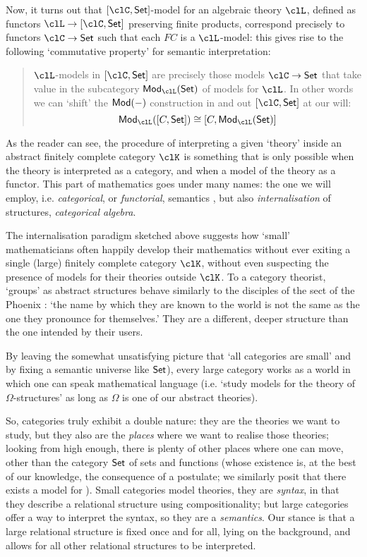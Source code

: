 Now, it turns out that $[\clC,\Set]$-model for an algebraic theory $\clL$, defined as functors $\clL \to [\clC,\Set]$ preserving finite products, correspond precisely to functors $\clC\to \Set$ such that each $FC$ is a $\clL$-model: this gives rise to the following `commutative property' for semantic interpretation:
\begin{quote}
    $\clL$-models in $[\clC,\Set]$ are precisely those models $\clC \to \Set$ that take value in the subcategory $\cate{Mod}_{\clL}(\Set)$ of models for $\clL$. In other words we can `shift' the $\mathsf{Mod}(-)$ construction in and out $[\clC,\Set]$ at our will:
    \[
        \cate{Mod}_{\clL}([C,\Set]) \cong [C, \cate{Mod}_{\clL}(\Set)]
    \]
\end{quote}
As the reader can see, the procedure of interpreting a given `theory' inside an abstract finitely complete category $\clK$ is something that is only possible when the theory is interpreted as a category, and when a model of the theory as a functor. This part of mathematics goes under many names: the one we will employ, i.e. \emph{categorical}, or \emph{functorial}, semantics \cite{lawvere1963functorial}, but also \emph{internalisation} of structures, \emph{categorical algebra}.

The internalisation paradigm sketched above suggests how `small' mathematicians often happily develop their mathematics without ever exiting a single (large) finitely complete category $\clK$, without even suspecting the presence of models for their theories outside $\clK$. To a category theorist, `groups' as abstract structures behave similarly to the disciples of the sect of the Phoenix \cite{fenix}: `the name by which they are known to the world is not the same as the one they pronounce for themselves.' They are a different, deeper structure than the one intended by their users.

By leaving the somewhat unsatisfying picture that `all categories are small' and by fixing a semantic universe like $\mathsf{Set}$), every large category works as a world in which one can speak mathematical language (i.e. `study models for the theory of $\Omega$-structures' as long as $\Omega$ is one of our abstract theories).

So, categories truly exhibit a double nature: they are the theories we want to study, but they also are the \emph{places} where we want to realise those theories; looking from high enough, there is plenty of other places where one can move, other than the category $\mathsf{Set}$ of sets and functions (whose existence is, at the best of our knowledge, the consequence of a postulate; we similarly posit that there exists a model for ). Small categories model theories, they are \emph{syntax}, in that they describe a relational structure using compositionality; but large categories offer a way to interpret the syntax, so they are a \emph{semantics}. Our stance is that a large relational structure is fixed once and for all, lying on the background, and allows for all other relational structures to be interpreted.


